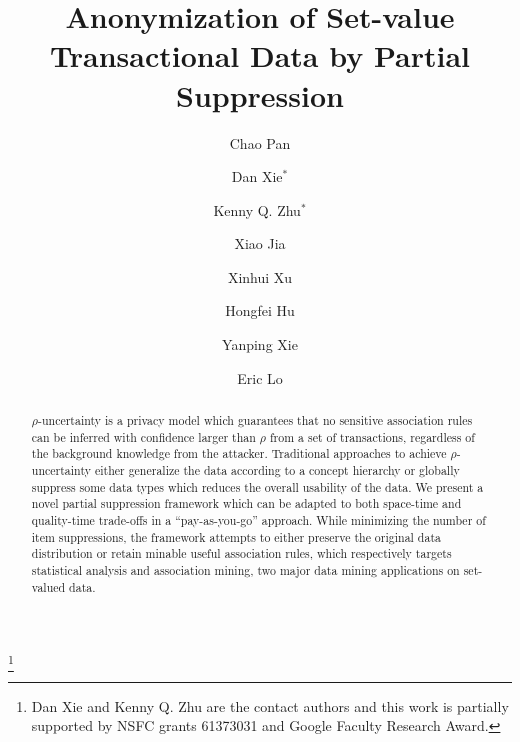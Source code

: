 \documentclass[smallextended]{svjour3}
\begin{document}
\title{Anonymization of Set-value Transactional Data by Partial Suppression}

\author{
Chao Pan
\and Dan Xie$^*$
\and Kenny Q. Zhu$^*$
\and Xiao Jia
\and Xinhui Xu
\and Hongfei Hu
\and Yanping Xie
\and Eric Lo
}

\thanks{Dan Xie and Kenny Q. Zhu are the contact authors
and this work is partially supported by NSFC grants 61373031 and
Google Faculty Research Award.}

\maketitle

\begin{abstract}
$\rho$-uncertainty is a privacy model which guarantees that
no sensitive association rules can be inferred with confidence
larger than $\rho$ from a set of transactions, regardless of
the background knowledge from the attacker.
Traditional approaches to achieve $\rho$-uncertainty either
generalize the data according to a concept hierarchy or globally
suppress some data types which reduces the overall usability of the
data. We present a novel partial suppression framework
which can be adapted to both space-time and quality-time
trade-offs in a ``pay-as-you-go'' approach.
While minimizing the number of item suppressions,
the framework attempts to either preserve the
original data distribution or retain minable useful
association rules,
which respectively targets statistical analysis and
association mining,
two major data mining applications on set-valued data.
\end{abstract}









\end{document}
